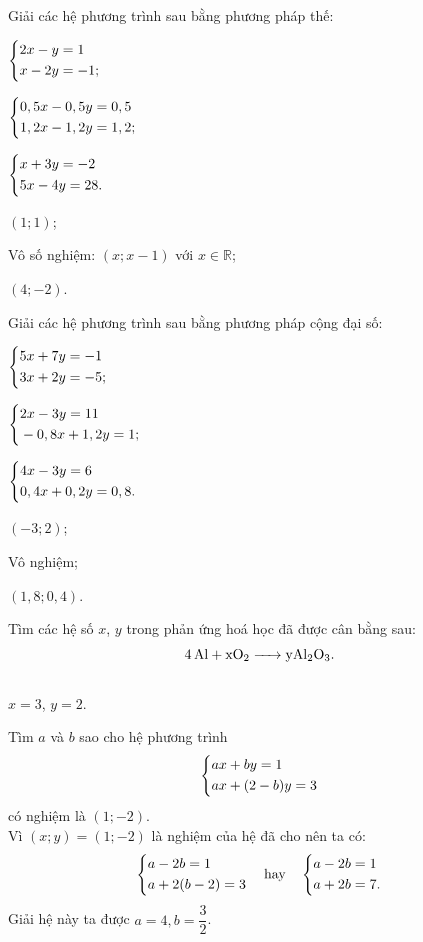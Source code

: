 \begin{baitap}[1.11]
	Giải các hệ phương trình sau bằng phương pháp thế:
	\begin{listEX}
		\item $\left\{\begin{aligned}&2x - y = 1 \\ &x - 2y = -1;\end{aligned}\right.$
		\item $\left\{\begin{aligned}&0,5x - 0,5y = 0,5 \\ &1,2x - 1,2y = 1,2;\end{aligned}\right.$
		\item $\left\{\begin{aligned}&x + 3y = -2 \\ &5x - 4y = 28.\end{aligned}\right.$
	\end{listEX}
	\doicot
	\huongdan
	\begin{listEX}
		\item $(1;1)$;
		\item Vô số nghiệm: $(x;x-1)$ với $x\in\mathbb{R}$;
		\item $(4;-2)$.
	\end{listEX}
\end{baitap}

\begin{baitap}[1.12]
	Giải các hệ phương trình sau bằng phương pháp cộng đại số:
	\begin{listEX}
		\item $\left\{\begin{aligned}&5x + 7y = -1 \\ &3x + 2y = -5;\end{aligned}\right.$
		\item $\left\{\begin{aligned}&2x - 3y = 11 \\ &-0,8x + 1,2y = 1;\end{aligned}\right.$
		\item $\left\{\begin{aligned}&4x - 3y = 6 \\ &0,4x + 0,2y = 0,8.\end{aligned}\right.$
	\end{listEX}
	\doicot
	\huongdan
	\begin{listEX}
		\item $(-3;2)$;
		\item Vô nghiệm;
		\item $(1{,}8;0{,}4)$.
	\end{listEX}
\end{baitap}

\begin{baitap}[1.13]
	Tìm các hệ số $x$, $y$ trong phản ứng hoá học đã được cân bằng sau:
	$$\ce{4Al + xO2 -> yAl2O3}.$$
	\doicot
	\huongdan\\
	$x=3$, $y=2$.
\end{baitap}

\begin{baitap}[1.14]
	Tìm $a$ và $b$ sao cho hệ phương trình 
	$$\left\{\begin{aligned}&ax + by = 1 \\ &ax + (2 - b)y = 3\end{aligned}\right.$$ 
	có nghiệm là $(1; -2)$.
	\doicot
	\huongdan\\
	Vì $(x; y) = (1; -2)$ là nghiệm của hệ đã cho nên ta có:
	$$\left\{\begin{aligned}&a - 2b = 1 \\ &a + 2(b - 2) = 3\end{aligned}\right. \quad \text{hay} \quad \left\{\begin{aligned}&a - 2b = 1 \\ &a + 2b = 7.\end{aligned}\right.$$
	Giải hệ này ta được $a = 4, b = \dfrac{3}{2}$.
\end{baitap}

